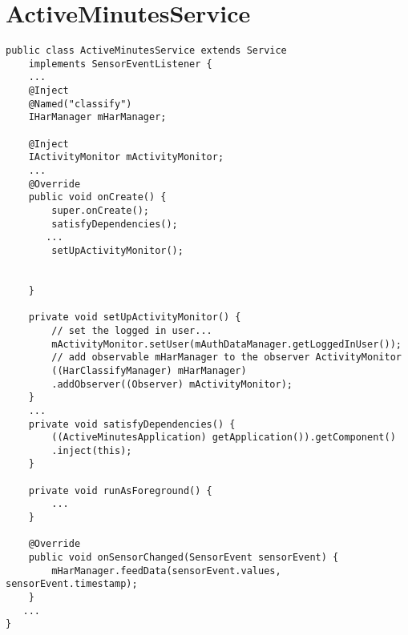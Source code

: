 \chapter{ActiveMinutesService}
\label{chapter:active-minutes-service}
\begin{lstlisting}[caption=ActiveMinutesService class (simplified),
    frame=tlrbr,
    basicstyle=\small,
    captionpos=b,
    label=observer-observable-example]
    public class ActiveMinutesService extends Service
    implements SensorEventListener {
    ...
    @Inject
    @Named("classify")
    IHarManager mHarManager;

    @Inject
    IActivityMonitor mActivityMonitor;
    ...
    @Override
    public void onCreate() {
        super.onCreate();
        satisfyDependencies();
       ...
        setUpActivityMonitor();


    }

    private void setUpActivityMonitor() {
        // set the logged in user...
        mActivityMonitor.setUser(mAuthDataManager.getLoggedInUser());
        // add observable mHarManager to the observer ActivityMonitor
        ((HarClassifyManager) mHarManager)
        .addObserver((Observer) mActivityMonitor);
    }
    ...
    private void satisfyDependencies() {
        ((ActiveMinutesApplication) getApplication()).getComponent()
        .inject(this);
    }

    private void runAsForeground() {
        ...
    }

    @Override
    public void onSensorChanged(SensorEvent sensorEvent) {
        mHarManager.feedData(sensorEvent.values, sensorEvent.timestamp);
    }
   ...
}
\end{lstlisting}